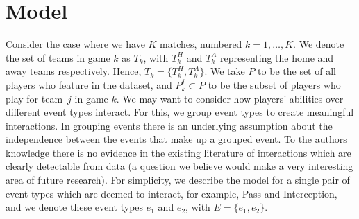 \documentclass[11pt,a4paper]{article}
\begin{document}
  
 



 
 
 
 
 
 
 
 
 
 
 

\section{Model} \label{bayes}

Consider the case where we have $K$ matches, numbered $k=1,\ldots,K$. 
We denote the set of teams in game $k$ as $T_k$, with $T_k^H$ and 
$T_k^A$ representing the home and away teams respectively. Hence, 
$T_k = \{T_k^H, T_k^A\}$. We take $P$ to be the set of all players who 
feature in the dataset, and $P_k^j\subset P$ to be the subset of players 
who play for team~$j$ in game $k$. We may want to consider how 
players' abilities over different event types interact. For this, we 
group event types to create meaningful interactions. In grouping events 
there is an underlying assumption about the independence between the 
events that make up a grouped event. To the authors knowledge there is 
no evidence in the existing literature of interactions which are clearly 
detectable from data (a question we believe would make a very interesting 
area of future research). For simplicity, 
we describe the model for a single pair of event types which are deemed 
to interact, for example, Pass and Interception, and we denote these event 
types $e_1$ and $e_2$, with $E=\{e_1, e_2\}$.
\end{document}
